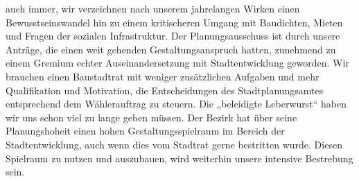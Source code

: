 \documentclass[a4paper,10pt]{article}
\begin{document}
auch immer, wir verzeichnen nach unserem jahrelangen Wirken einen
Bewusstseinswandel hin zu einem kritischeren Umgang mit Baudichten,
Mieten und Fragen der sozialen Infrastruktur. Der Planungsausschuss ist
durch unsere Anträge, die einen weit gehenden Gestaltungsanspruch
hatten, zunehmend zu einem Gremium echter Auseinandersetzung mit
Stadtentwicklung geworden. Wir brauchen einen Baustadtrat mit weniger
zusätzlichen Aufgaben und mehr Qualifikation und Motivation, die
Entscheidungen des Stadtplanungsamtes entsprechend dem Wählerauftrag zu
steuern. Die „beleidigte Leberwurst`` haben wir uns schon viel zu lange
geben müssen. Der Bezirk hat über seine Planungshoheit einen hohen
Gestaltungsspielraum im Bereich der Stadtentwicklung, auch wenn dies vom
Stadtrat gerne bestritten wurde. Diesen Spielraum zu nutzen und
auszubauen, wird weiterhin unsere intensive Bestrebung sein.

\subsection*{}
\end{document}
